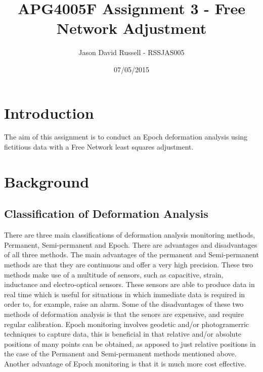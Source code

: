 \documentclass{article}
\title{APG4005F Assignment 3 - Free Network Adjustment}
\date{07/05/2015}
\author{Jason David Russell - RSSJAS005}
\begin{document}
\maketitle
{}

\newpage
\tableofcontents


\newpage
\section{Introduction}
The aim of this assignment is to conduct an Epoch deformation analysis using
fictitious data with a Free Network least squares adjustment.


\section{Background}
\subsection{Classification of Deformation Analysis}
There are three main classifications of deformation analysis monitoring methods,
Permanent, Semi-permanent and Epoch. There are advantages and disadvantages of all
three methods. The main advantages of the permanent and Semi-permanent methods
are that they are continuous and offer a very high precision. These two methods
make use of a multitude of sensors, such as capacitive, strain, inductance and
electro-optical sensors. These sensors are able to produce data in real time which
is useful for situations in which immediate data is required in order to, for
example, raise an alarm. Some of the disadvantages of these two methods of
deformation analysis is that the senors are expensive, and require regular
calibration. Epoch monitoring involves geodetic and/or photogramerric techniques
to capture data, this is beneficial in that relative and/or absolute positions of
many points can be obtained, as apposed to just relative positions in the case
of the Permanent and Semi-permanent methods mentioned above. Another advantage
of Epoch monitoring is that it is much more cost effective.
\end{document}

